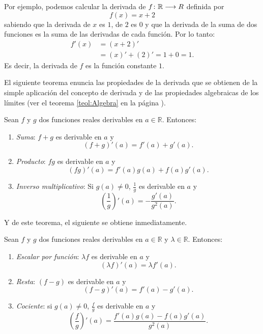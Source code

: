Por ejemplo, podemos calcular la derivada de $f\colon \mathbb{R}\longrightarrow R$ definida por
\[
f(x) = x + 2
\]
sabiendo que la derivada de $x$ es $1$, de $2$ es $0$ y que la derivada de la suma de dos funciones
es la suma de las derivadas de cada función. Por lo tanto:
\begin{align*}
f'(x) &= (x + 2)' \\
  &= (x)' + (2)' = 1 + 0 = 1.
\end{align*}
Es decir, la derivada de $f$ es la función constante $1$.

El siguiente teorema enuncia las propiedades de la derivada que se obtienen de la simple aplicación
del concepto de derivada y de las propiedades algebraicas de los límites (ver el teorema
\ref{teol:Algebra} en la página \pageref{teol:Algebra}).

\begin{teocal}\label{et:ddAlgebraDerivadasI}%
Sean $f$ y $g$ dos funciones reales derivables en $a \in
\mathbb{R}$. Entonces:
\begin{enumerate}
\item \textit{Suma}: $f + g$ es derivable en $a$ y
    \[
      (f + g)'(a) = f'(a) + g'(a).
    \]

\item \textit{Producto}: $fg$ es derivable en $a$ y
    \[
      (fg)'(a) = f'(a)g(a) + f(a)g'(a).
    \]

\item \textit{Inverso multiplicativo}: Si $g(a) \neq 0$, $\frac{1}{g}$ es derivable en $a$ y
    \[
      \left(\frac{1}{g}\right)'(a) = -\frac{g'(a)}{g^2(a)}.
    \]
\end{enumerate}
\end{teocal}

Y de este teorema, el siguiente se obtiene inmediatamente.

\begin{teocal}\label{et:ddAlgebraDerivadasII}%
Sean $f$ y $g$ dos funciones reales derivables en $a \in \mathbb{R}$ y
$\lambda\in\mathbb{R}$. Entonces:
\begin{enumerate}
\item \textit{Escalar por función}: $\lambda f$ es derivable en $a$ y
  \[
    (\lambda f)'(a) = \lambda f'(a).
  \]

\item \textit{Resta}: $(f - g)$ es derivable en $a$ y
    \[
      (f - g)'(a) = f'(a) - g'(a).
    \]

\item \textit{Cociente}: si $g(a) \neq 0$, $\frac{f}{g}$ es derivable en $a$ y
  \[
    \left(\frac{f}{g}\right)'(a) = \frac{f'(a)g(a) - f(a)g'(a)}{g^2(a)}.
  \]
\end{enumerate}
\end{teocal}

